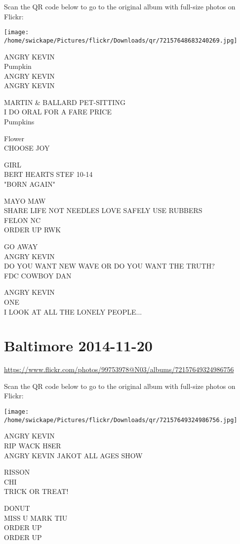 \documentclass[10pt,letterpaper]{article}
\begin{document}
Scan the QR code below to go to the original album with full-size photos on Flickr:

\texttt{[image: /home/swickape/Pictures/flickr/Downloads/qr/72157648683240269.jpg]}
\pagebreak

ANGRY KEVIN\\
Pumpkin\\
ANGRY KEVIN\\
ANGRY KEVIN

MARTIN \& BALLARD PET{-}SITTING\\
I DO ORAL FOR A FARE PRICE\\
Pumpkins

Flower\\
CHOOSE JOY

GIRL\\
BERT HEARTS STEF 10{-}14\\
"BORN AGAIN"

MAYO MAW\\
SHARE LIFE NOT NEEDLES LOVE SAFELY USE RUBBERS\\
FELON NC\\
ORDER UP RWK

GO AWAY\\
ANGRY KEVIN\\
DO YOU WANT NEW WAVE OR DO YOU WANT THE TRUTH?\\
FDC COWBOY DAN

ANGRY KEVIN\\
ONE\\
I LOOK AT ALL THE LONELY PEOPLE...
\pagebreak

\section*{Baltimore 2014-11-20}

\url{https://www.flickr.com/photos/99753978@N03/albums/72157649324986756}

Scan the QR code below to go to the original album with full-size photos on Flickr:

\texttt{[image: /home/swickape/Pictures/flickr/Downloads/qr/72157649324986756.jpg]}
\pagebreak

ANGRY KEVIN\\
RIP WACK H8ER\\
ANGRY KEVIN JAKOT ALL AGES SHOW

RISSON\\
CHI\\
TRICK OR TREAT!

DONUT\\
MISS U MARK TIU\\
ORDER UP\\
ORDER UP
\end{document}
